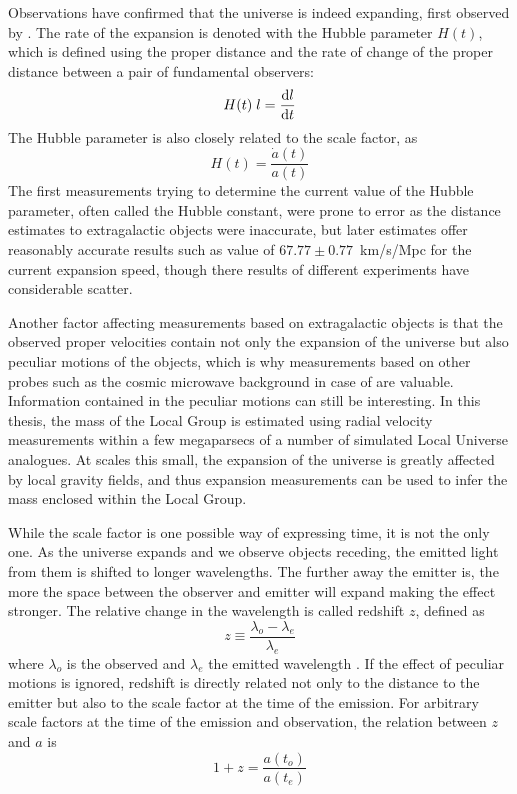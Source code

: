 \documentclass[english, oneside]{HYgradu}
\begin{document}
Observations have confirmed that the universe is indeed expanding, first observed by \citet{hubble1929relation}. The rate of the expansion is denoted with the Hubble parameter $H(t)$, which is defined using the proper distance and the rate of change of the proper distance between a pair of fundamental observers:
\begin{equation}
H(t)\; l = \dv{l}{t}
\end{equation}
The Hubble parameter is also closely related to the scale factor, as \citep{mo2010galaxy}
\begin{equation}
H(t) = \frac{\dot{a}(t)}{a(t)}
\end{equation}
The first measurements trying to determine the current value of the Hubble parameter, often called the Hubble constant, were prone to error as the distance estimates to extragalactic objects were inaccurate, but later estimates offer reasonably accurate results such as \citet{planck2014resultsXVI} value of $67.77 \pm 0.77$~km/s/Mpc for the current expansion speed, though there results of different experiments have considerable scatter.

Another factor affecting measurements based on extragalactic objects is that the observed proper velocities contain not only the expansion of the universe but also peculiar motions of the objects, which is why measurements based on other probes such as the cosmic microwave background in case of \citet{planck2016resultsI} are valuable. Information contained in the peculiar motions can still be interesting. In this thesis, the mass of the Local Group is estimated using radial velocity measurements within a few megaparsecs of a number of simulated Local Universe analogues. At scales this small, the expansion of the universe is greatly affected by local gravity fields, and thus expansion measurements can be used to infer the mass enclosed within the Local Group.

While the scale factor is one possible way of expressing time, it is not the only one. As the universe expands and we observe objects receding, the emitted light from them is shifted to longer wavelengths. The further away the emitter is, the more the space between the observer and emitter will expand making the effect stronger. The relative change in the wavelength is called redshift $z$, defined as
\begin{equation}
z \equiv \frac{\lambda_o - \lambda_e}{\lambda_e}
\end{equation}
where $\lambda_o$ is the observed and $\lambda_e$ the emitted wavelength \citep{mo2010galaxy}. If the effect of peculiar motions is ignored, redshift is directly related not only to the distance to the emitter but also to the scale factor at the time of the emission. For arbitrary scale factors at the time of the emission and observation, the relation between $z$ and $a$ is \citep{mo2010galaxy}
\begin{equation}
1 + z = \frac{a(t_o)}{a(t_e)}
\end{equation}
\end{document}
